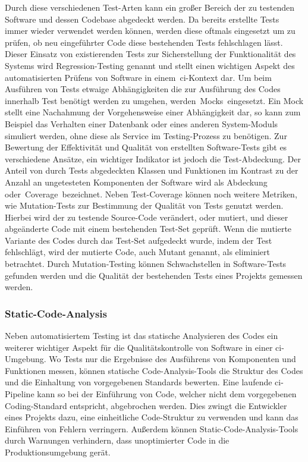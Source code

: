 Durch diese verschiedenen Test-Arten kann ein großer Bereich der zu testenden Software und dessen Codebase abgedeckt
werden.
Da bereits erstellte Tests immer wieder verwendet werden können, werden diese oftmals eingesetzt um zu prüfen, ob neu
eingeführter Code diese bestehenden Tests fehlschlagen lässt.
Dieser Einsatz von existierenden Tests zur Sicherstellung der Funktionalität des Systems wird Regression-Testing
genannt und stellt einen wichtigen Aspekt des automatisierten Prüfens von Software in einem\ \acrshort{ci}-Kontext dar.
Um beim Ausführen von Tests etwaige Abhängigkeiten die zur Ausführung des Codes innerhalb Test benötigt werden zu
umgehen, werden\ \glqq Mocks\grqq\ eingesetzt.
Ein Mock stellt eine Nachahmung der Vorgehensweise einer Abhängigkeit dar, so kann zum Beispiel das Verhalten
einer Datenbank oder eines anderen System-Moduls simuliert werden, ohne diese als Service im Testing-Prozess zu
benötigen.
Zur Bewertung der Effektivität und Qualität von erstellten Software-Tests gibt es verschiedene Ansätze, ein
wichtiger Indikator ist jedoch die Test-Abdeckung.
Der Anteil von durch Tests abgedeckten Klassen und Funktionen im Kontrast zu der Anzahl an
ungetesteten Komponenten der Software wird als Abdeckung oder\ \glqq Coverage\grqq\ bezeichnet.
Neben Test-Coverage können noch weitere Metriken, wie Mutation-Tests zur Bestimmung der Qualität von Tests genutzt
werden.
Hierbei wird der zu testende Source-Code verändert, oder mutiert, und dieser abgeänderte Code mit einem
bestehenden Test-Set geprüft.
Wenn die mutierte Variante des Codes durch das Test-Set aufgedeckt wurde, indem der Test fehlschlägt, wird
der mutierte Code, auch Mutant genannt, als eliminiert betrachtet.
Durch Mutation-Testing können Schwachstellen in Software-Tests gefunden werden und die Qualität der bestehenden
Tests eines Projekts gemessen werden.

\subsubsection{Static-Code-Analysis}

Neben automatisiertem Testing ist das statische Analysieren des Codes ein weiterer wichtiger Aspekt für die
Qualitätskontrolle von Software in einer \acrshort{ci}-Umgebung.
Wo Tests nur die Ergebnisse des Ausführens von Komponenten und Funktionen messen, können statische
Code-Analysis-Tools die Struktur des Codes und die Einhaltung von vorgegebenen Standards bewerten.
Eine laufende \acrshort{ci}-Pipeline kann so bei der Einführung von Code, welcher nicht dem vorgegebenen Coding-Standard
entspricht, abgebrochen werden.
Dies zwingt die Entwickler eines Projekts dazu, eine einheitliche Code-Struktur zu verwenden und kann das Einführen
von Fehlern verringern.
Außerdem können Static-Code-Analysis-Tools durch Warnungen verhindern, dass unoptimierter Code in die
Produktionsumgebung gerät.

